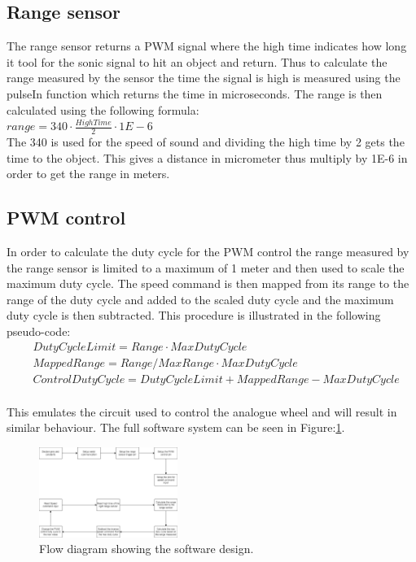 \subsection{Range sensor}
The range sensor returns a PWM signal where the high time indicates how long it tool for the sonic signal to hit an object and return. Thus to calculate the range measured by the sensor the time the signal is high is measured using the pulseIn function which returns the time in microseconds. The range is  then calculated using the following formula:\\ $range = 340 \cdot \frac{HighTime}{2} \cdot 1E-6$\\ 
The 340 is used for the speed of sound and dividing the high time by 2 gets the time to the object. This gives a distance in micrometer thus multiply by 1E-6 in order to get the range in meters.
\subsection{PWM control}
In order to calculate the duty cycle for the PWM control the range measured by the range sensor is limited to a maximum of 1 meter and then used to scale the maximum duty cycle. The speed command is then mapped from its range to the range of the duty cycle and added to the scaled duty cycle and the maximum duty cycle is then subtracted. This procedure is illustrated in the following pseudo-code:\\
\begin{align*}
& DutyCycleLimit = Range \cdot MaxDutyCycle\\
& MappedRange = Range/MaxRange \cdot MaxDutyCycle\\
& ControlDutyCycle = DutyCycleLimit+MappedRange-MaxDutyCycle\\
\end{align*}

This emulates the circuit used to control the analogue wheel and will result in similar behaviour. The full software system can be seen in Figure:\ref{fig:dig_ctrl_flow}.

\begin{figure}[H]
\centering
\includegraphics[width = 0.4\textwidth]{./Figures/Dig_Ctrl_Flow.png}
\caption{Flow diagram showing the software design.}
\label{fig:dig_ctrl_flow}
\end{figure}








